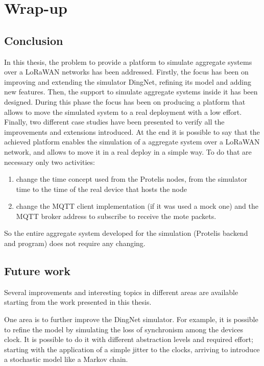 \chapter{Wrap-up}
\label{chap:conclusions}
\section{Conclusion} 
In this thesis, the problem to provide a platform to simulate aggregate systems over a LoRaWAN networks has been addressed.
Firstly, the focus has been on improving and extending the simulator DingNet, refining its model and adding new features.
Then, the support to simulate aggregate systems inside it has been designed. 
During this phase the focus has been on producing a platform that allows to move the simulated system to a real deployment with a low effort.
Finally, two different case studies have been presented to verify all the improvements and extensions introduced.
At the end it is possible to say that the achieved platform enables the simulation of a aggregate system over a LoRaWAN network, and allows to move it in a real deploy in a simple way. 
To do that are necessary only two activities:
\begin{enumerate}
    \item change the time concept used from the Protelis nodes, from the simulator time to the time of the real device that hosts the node
    \item change the MQTT client implementation (if it was used a mock one) and the MQTT broker address to subscribe to receive the mote packets.
\end{enumerate}
 So the entire aggregate system developed for the simulation (Protelis backend and program) does not require any changing.

\section{Future work}
Several improvements and interesting topics in different areas are available starting from the work presented in this thesis.

One area is to further improve the DingNet simulator. 
For example, it is possible to refine the model by simulating the loss of synchronism among the devices clock. It is possible to do it with different abstraction levels and required effort; starting with the application of a simple jitter to the clocks, arriving to introduce a stochastic model like a Markov chain.

